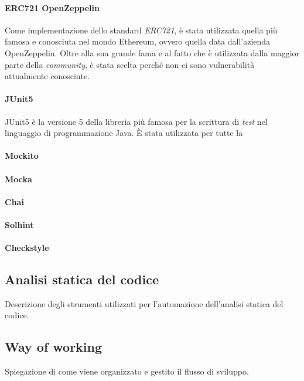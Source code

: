 \paragraph{ERC721 OpenZeppelin}
Come implementazione dello standard \textit{ERC721}, è stata utilizzata quella più famosa e conosciuta nel mondo Ethereum, ovvero quella data dall'azienda OpenZeppelin. Oltre alla sua grande fama e al fatto che è utilizzata dalla maggior parte della \textit{community}, è stata scelta perché non ci sono vulnerabilità attualmente conosciute.

\paragraph{JUnit5}

JUnit5 è la versione 5 della libreria più famosa per la scrittura di \textit{test} nel linguaggio di programmazione Java. È stata utilizzata per tutte la

\paragraph{Mockito}

\paragraph{Mocka}

\paragraph{Chai}

\paragraph{Solhint}

\paragraph{Checkstyle}


\subsection{Analisi statica del codice}
Descrizione degli strumenti utilizzati per l'automazione dell'analisi statica del codice.

\subsection{Way of working}
Spiegazione di come viene organizzato e gestito il flusso di sviluppo.
